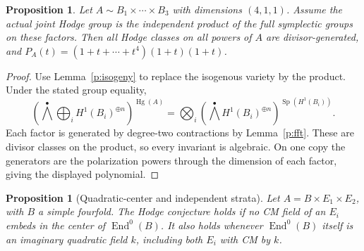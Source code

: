 \documentclass[10pt,reqno]{article}
\theoremstyle{emphasizedplain}
\newtheorem{proposition}[theorem]{Proposition}
\theoremstyle{emphasizeddefinition}
\theoremstyle{emphasizeddefinition}
\DeclareMathOperator{\End}{End}
\DeclareMathOperator{\Hg}{Hg}
\DeclareMathOperator{\Sp}{Sp}
\begin{document}
\begin{proposition}
Let $A\sim B_1\times\cdots\times B_{3}$ with dimensions
$(4,1,1)$. Assume the actual joint Hodge group is the
independent product of the full symplectic groups on these factors.
Then all Hodge classes on all powers of $A$ are divisor-generated,
and $P_A(t)=(1+t+\cdots+t^{4})(1+t)(1+t)$.
\end{proposition}
\begin{proof}
Use Lemma~\ref{p:isogeny} to replace the isogenous variety by the product.
Under the stated group equality,
\[
 \left(\bigwedge^\bullet\bigoplus_i H^1(B_i)^{\oplus n}\right)^{\Hg(A)}
 =\bigotimes_i\left(\bigwedge^\bullet H^1(B_i)^{\oplus n}\right)^{\Sp(H^1(B_i))}.
\]
Each factor is generated by degree-two contractions by Lemma~\ref{p:fft}.
These are divisor classes on the product, so every invariant is algebraic.
On one copy the generators are the polarization powers through the
dimension of each factor, giving the displayed polynomial.
\end{proof}
\begin{proposition}[Quadratic-center and independent strata]\label{p:N3strata}
Let $A=B\times E_1\times E_2$, with $B$ a simple fourfold.
The Hodge conjecture holds if no CM field of an $E_i$ embeds in the
center of $\End^0(B)$. It also holds whenever $\End^0(B)$ itself is
an imaginary quadratic field $k$, including both $E_i$ with CM by $k$.
\end{proposition}
\end{document}
